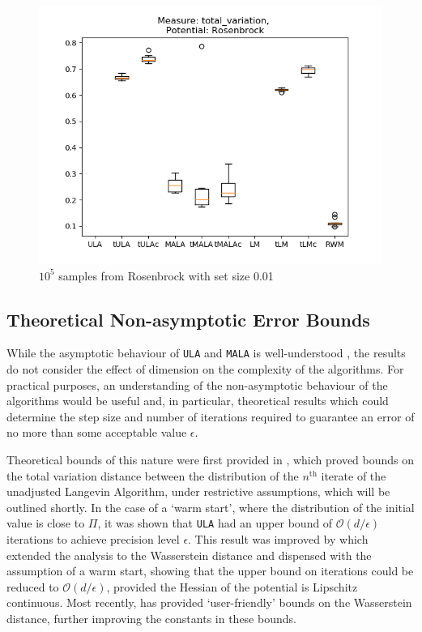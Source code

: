\begin{figure}[ht!]
	\centering
		\includegraphics[height=0.43\textheight]{WriteUp/TV_rosenbrock_step0pt01.png}
	\caption{$10^5$ samples from Rosenbrock with set size 0.01}
	\label{fig:TVrosen01}
\end{figure}

\newpage
\subsection{Theoretical Non-asymptotic Error Bounds}

While the asymptotic behaviour of \texttt{ULA} and \texttt{MALA} is well-understood \cite{RT96}, the results do not consider the effect of dimension on the complexity of the algorithms.  For practical purposes, an understanding of the non-asymptotic behaviour of the algorithms would be useful and, in particular, theoretical results which could determine the step size and number of iterations required to guarantee an error of no more than some acceptable value $\epsilon$.

Theoretical bounds of this nature were first provided in \cite{dalalyan2017theoretical}, which proved bounds on the total variation distance between the distribution of the $n^{\text{th}}$ iterate of the unadjusted Langevin Algorithm, under restrictive assumptions, which will be outlined shortly.  In the case of a `warm start', where the distribution of the initial value is close to $\Pi$, it was shown that \texttt{ULA} had an upper bound of $\mathcal{O}(d/\epsilon)$ iterations to achieve precision level $\epsilon$.  This result was improved by \cite{durmus2016high, durmus2017nonasymptotic} which extended the analysis to the Wasserstein distance and dispensed with the assumption of a warm start, showing that the upper bound on iterations could be reduced to $\mathcal O (d/\epsilon)$, provided the Hessian of the potential is Lipschitz continuous.  Most recently, \cite{dalalyan2019user} has provided `user-friendly' bounds on the Wasserstein distance, further improving the constants in these bounds.

